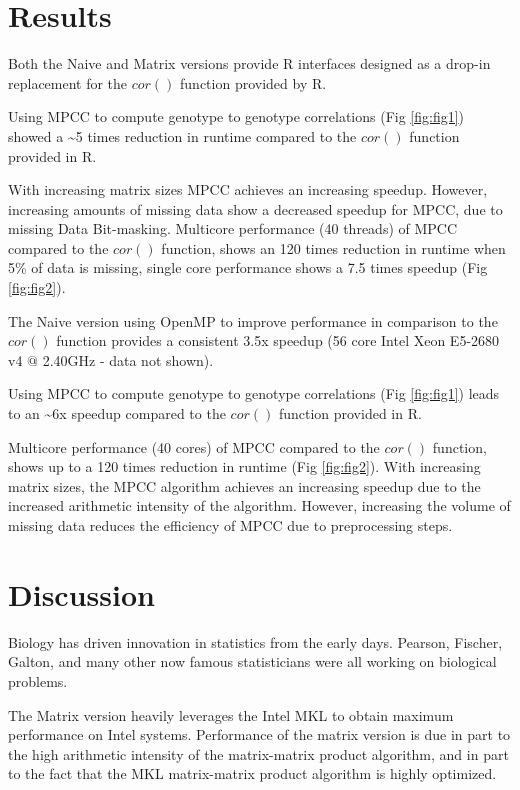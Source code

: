 \documentclass{bioinfo}
\begin{document}
\vspace*{-2mm}

\section{Results}

Both the Naive and Matrix versions provide R interfaces designed as a
drop-in replacement for the $cor()$ function provided by R.

Using MPCC to compute genotype to genotype correlations
(Fig \ref{fig:fig1}) showed a \textasciitilde{}5 times reduction in
runtime compared to the $cor()$ function provided in R.

With increasing matrix sizes MPCC achieves an increasing
speedup. However, increasing amounts of missing data show a decreased
speedup for MPCC, due to missing Data Bit-masking. Multicore
performance (40 threads) of MPCC compared to the $cor()$ function,
shows an 120 times reduction in runtime when 5\% of data is missing,
single core performance shows a 7.5 times speedup
(Fig \ref{fig:fig2}).

The Naive version using OpenMP to improve performance in comparison to
the $cor()$ function provides a consistent 3.5x speedup (56 core Intel
Xeon E5-2680 v4 $@$ 2.40GHz - data not shown).

Using MPCC to compute genotype to genotype correlations
(Fig \ref{fig:fig1}) leads to an \textasciitilde{}6x speedup compared
to the $cor()$ function provided in R.

Multicore performance (40 cores) of MPCC compared to the $cor()$
function, shows up to a 120 times reduction in runtime
(Fig \ref{fig:fig2}). With increasing matrix sizes, the MPCC algorithm
achieves an increasing speedup due to the increased arithmetic
intensity of the algorithm. However, increasing the volume of missing
data reduces the efficiency of MPCC due to preprocessing steps.

\vspace*{-5mm}
\section{Discussion}

Biology has driven innovation in statistics from the early
days. Pearson, Fischer, Galton, and many other now famous
statisticians were all working on biological problems.

The Matrix version heavily leverages the Intel\textregistered{} MKL to
obtain maximum performance on Intel\textregistered{}
systems. Performance of the matrix version is due in part to the high
arithmetic intensity of the matrix-matrix product algorithm, and in
part to the fact that the MKL matrix-matrix product algorithm is
highly optimized.
\end{document}
